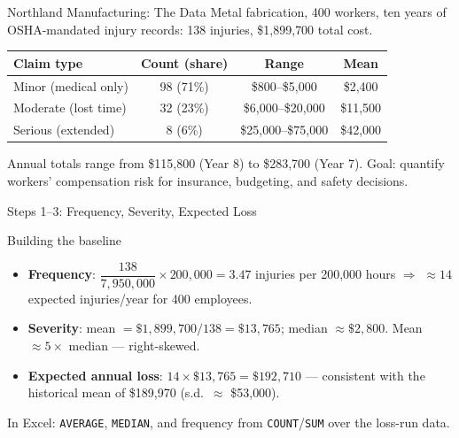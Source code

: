 \documentclass[11pt, aspectratio=169]{beamer}
\begin{document}
\begin{frame}{Northland Manufacturing: The Data}
Metal fabrication, 400 workers, ten years of OSHA-mandated injury records: \alert{138 injuries, \$1{,}899{,}700 total cost}.
\medskip
\begin{center}
\small
\begin{tabular}{lccc}
\toprule
Claim type & Count (share) & Range & Mean \\
\midrule
Minor (medical only) & 98 (71\%) & \$800--\$5{,}000 & \$2{,}400 \\
Moderate (lost time) & 32 (23\%) & \$6{,}000--\$20{,}000 & \$11{,}500 \\
Serious (extended) & 8 (6\%) & \$25{,}000--\$75{,}000 & \$42{,}000 \\
\bottomrule
\end{tabular}
\end{center}
\medskip
Annual totals range from \$115{,}800 (Year 8) to \$283{,}700 (Year 7). Goal: quantify workers' compensation risk for insurance, budgeting, and safety decisions.
\end{frame}

\begin{frame}{Steps 1--3: Frequency, Severity, Expected Loss}
\begin{exampleblock}{Building the baseline}
\begin{itemize}
  \item \textbf{Frequency}: $\dfrac{138}{7{,}950{,}000} \times 200{,}000 = 3.47$ injuries per 200{,}000 hours $\Rightarrow$ $\approx 14$ expected injuries/year for 400 employees.
  \item \textbf{Severity}: mean $= \$1{,}899{,}700 / 138 = \$13{,}765$; median $\approx \$2{,}800$. Mean $\approx 5\times$ median --- right-skewed.
  \item \textbf{Expected annual loss}: $14 \times \$13{,}765 = \$192{,}710$ --- consistent with the historical mean of \$189{,}970 (s.d.\ $\approx$ \$53{,}000).
\end{itemize}
\end{exampleblock}
In Excel: \texttt{AVERAGE}, \texttt{MEDIAN}, and frequency from \texttt{COUNT}/\texttt{SUM} over the loss-run data.
\end{frame}
\end{document}
